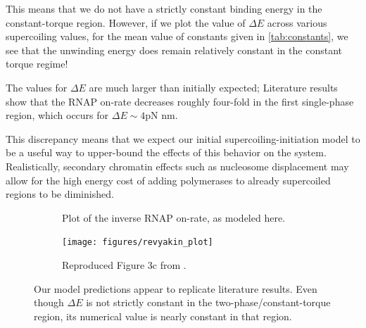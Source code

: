 \documentclass[11pt]{article}
\begin{document}
This means that we do not have a strictly constant binding energy in the constant-torque region. However, if we plot the value of \(\Delta E\) across various supercoiling values, for the mean value of constants given in \autoref{tab:constants}, we see that the unwinding energy does remain relatively constant in the constant torque regime!

The values for \(\Delta E\) are much larger than initially expected; Literature results show that the RNAP on-rate decreases roughly four-fold in the first single-phase region, which occurs for \(\Delta E \sim 4 \text{pN nm}\). 

This discrepancy means that we expect our initial supercoiling-initiation model to be a useful way to upper-bound the effects of this behavior on the system. Realistically, secondary chromatin effects such as nucleosome displacement may allow for the high energy cost of adding polymerases to already supercoiled regions to be diminished.

\begin{figure}[h]
    \centering
    \begin{subfigure}{.49\linewidth}
        \centering
        \caption{Plot of the inverse RNAP on-rate, as modeled here.}
    \end{subfigure}
    \begin{subfigure}{.49\linewidth}
        \centering
        \texttt{[image: figures/revyakin\_plot]}
        \caption{Reproduced Figure 3c from \textcite{revyakinPromoterUnwindingPromoter2004}.}
    \end{subfigure}
    \caption{Our model predictions appear to replicate literature results. Even though \(\Delta E\) is not strictly constant in the two-phase/constant-torque region, its numerical value is nearly constant in that region.}
\end{figure}
\end{document}
